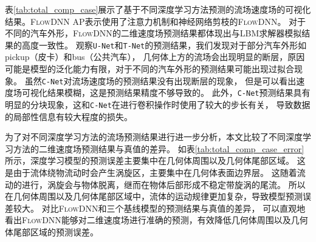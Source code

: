 表\ref{tab:total_comp_case}展示了基于不同深度学习方法预测的流场速度场的可视化结果。\textsc{FlowDNN} AP表示使用了注意力机制和神经网络剪枝的\textsc{FlowDNN}。
对于不同的汽车外形，\textsc{FlowDNN}的二维速度场预测结果都体现出与LBM求解器模拟结果的高度一致性。
观察\texttt{U-Net}和\texttt{T-Net}的预测结果，我们发现对于部分汽车外形如pickup（皮卡）和bus（公共汽车），
几何体上方的流场会出现明显的断层，原因可能是模型的泛化能力有限，对于不同的汽车外形的预测结果可能出现过拟合现象。
虽然\texttt{C-Net}对流场速度场的预测结果没有出现断层的现象，
但是可以看出速度场可视化结果模糊，这是预测结果精度不够导致的。
此外，\texttt{C-Net}预测结果具有明显的分块现象，这和\texttt{C-Net}在进行卷积操作时使用了较大的步长有关，
导致数据的局部性信息有较大程度的损失。



为了对不同深度学习方法的流场预测结果进行进一步分析，本文比较了不同深度学习方法的二维速度场预测结果与真值的差异。
如表\ref{tab:total_comp_case_error}所示，深度学习模型的预测误差主要集中在几何体周围以及几何体尾部区域。
这是由于流体绕物流动时会产生涡旋区，主要集中在几何体表面边界层。
这随着流动的进行，涡旋会与物体脱离，继而在物体后部形成不稳定带旋涡的尾流。
所以在几何体周围以及几何体尾部区域中，流体的运动规律更加复杂，导致模型预测误差较大。
对比\textsc{FlowDNN}和三个基线模型的预测结果与真值的差异，
可以直观地看出\textsc{FlowDNN}能够对二维速度场进行准确的预测，有效降低几何体周围以及几何体尾部区域的预测误差。




